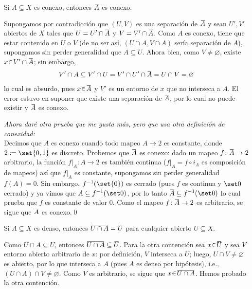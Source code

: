 \begin{ejer}
Si $A\subseteq X$ es conexo, entonces $\ubar{A}$ es conexo.
\end{ejer}
\begin{sol}[Demostración]
Supongamos por contradicción que $(U,V)$ es una separación de $\ubar{A}$ y sean $U', V'$ abiertos de $X$ tales que $U = U' \cap \ubar{A}$ y $V = V' \cap \ubar{A}$. Como $A$ es conexo, tiene que estar contenido en $U$ o $V$ (de no ser así, $(U \cap A,V \cap A)$ sería separación de $A$), supongamos sin perder generalidad que $A \subseteq U$. Ahora bien, como $V \neq \varnothing$, existe $x \en V' \cap \ubar{A}$; sin embargo,
\[
    V' \cap A \subseteq V' \cap U%
    = V' \cap U' \cap \ubar{A}%
    = U \cap V%
    = \varnothing
\]
lo cual es absurdo, pues $x \en \ubar{A}$ y $V'$ es un entorno de $x$ que no interseca a $A$. El error estuvo en suponer que existe una separación de $\ubar{A}$, por lo cual no puede existir y $\ubar{A}$ es conexo.\qedhere\par
\vspace{1em}
\emph{Ahora daré otra prueba que me gusta más, pero que usa otra definición de conexidad:}\\
Decimos que $A$ es conexo cuando todo mapeo $A \to 2$ es constante, donde $2 \coloneq \set{0,1}$ es discreto. Probemos que $\ubar{A}$ es conexo: dado un mapeo $f \colon \ubar{A} \to 2$ arbitrario, la función $f|_{A} \colon A \to 2$ es también continua ($f|_A = f \circ i_A$ es composición de mapeos) así que $f|_A$ es constante, supongamos sin perder generalidad $f(A) = 0$. Sin embargo, $f^{-1}(\set{0})$ es cerrado (pues $f$ es continua y $\set0$ cerrado) y ya vimos que $A \subseteq f^{-1}(\set0)$, por lo tanto $\ubar{A} \subseteq f^{-1}(\set0)$ lo cual prueba que $f$ es constante de valor $0$. Como el mapeo $f\colon \ubar{A} \to 2$ es arbitrario, se sigue que $\ubar{A}$ es conexo.\qed
\end{sol}\clearpage

\begin{ejer}
Si $A\subseteq X$ es denso, entonces $\ubar{U\cap A}=\ubar{U}$ para cualquier abierto $U\subseteq X$.
\end{ejer}
\begin{sol}[Demostración]
Como $U \cap A \subseteq U$, entonces $\ubar{U \cap A} \subseteq \ubar{U}$. Para la otra contención sea $x \en \ubar{U}$ y sea $V$ entorno abierto arbitrario de $x$: por definición, $V$ interseca a $U$; luego, $U \cap V \neq \varnothing$ es abierto, por lo que interseca a $A$ (pues $A$ es denso por hipótesis), i.e., $(U \cap A) \cap V \neq \varnothing$. Como $V$ es arbitrario, se sigue que $x \en \ubar{U \cap A}$. Hemos probado la otra contención.
\end{sol}

